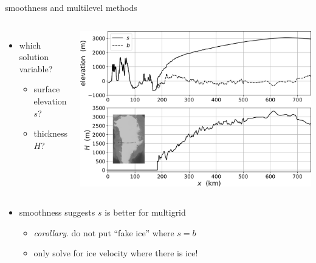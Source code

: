 \documentclass[usepdftitle=false,usenames,dvipsnames]{beamer}
\begin{document}
\begin{frame}{smoothness and multilevel methods}

\begin{columns}
    \begin{itemize}
    \small
    \item which solution variable?
        \begin{itemize}
        \item surface elevation $s$?
        \item thickness $H$?
        \end{itemize}
    \end{itemize}
    \includegraphics[width=\textwidth]{figs/giscross.png}
\end{columns}

\bigskip
\begin{itemize}
\item \alert{smoothness suggests $s$ is better for multigrid}
    \begin{itemize}
    \item \emph{corollary}. do not put ``fake ice'' where $s=b$
    \item only solve for ice velocity where there is ice!
    \end{itemize}
\end{itemize}
\end{frame}
\end{document}
